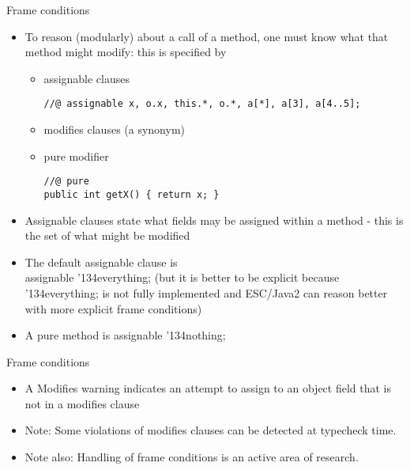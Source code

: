 \documentclass[
pdf,
nocolorBG,
slideColor,
cok,
]{prosper}
\newcommand{\bsl}{\char'134}
\begin{document}
\begin{slide}{Frame conditions}

\vspace*{-8ex}

\begin{itemize}
\item To reason (modularly) about a call of a method, one must know what that method might modify: this is specified by 
\begin{itemize}
\item {\knalblue assignable} clauses
{\tiny

\begin{verbatim}
//@ assignable x, o.x, this.*, o.*, a[*], a[3], a[4..5];
\end{verbatim}
}
\item {\knalblue modifies} clauses (a synonym)
\item {\knalblue pure} modifier
{\tiny

\begin{verbatim}
//@ pure
public int getX() { return x; }
\end{verbatim}
}

\end{itemize}
\item Assignable clauses state what fields may be assigned within a method
- this is the set of what might be modified
\item The default assignable clause is \\ {\knalblue assignable \bsl everything;} (but it is better to be explicit because {\knalblue \bsl everything;} is not fully implemented and ESC/Java2
can reason better with more explicit frame conditions)
\item A {\knalblue pure} method is  {\knalblue assignable \bsl nothing;}
\end{itemize}
\end{slide}

\begin{slide}{Frame conditions}

\vspace*{-6ex}

\begin{itemize}
\item A {\knalblue Modifies} warning indicates an attempt to assign to an object field that is not in a modifies clause
\item Note: Some violations of modifies clauses can be detected at typecheck time.
\item Note also:  Handling of frame conditions is an active area of research.
\end{itemize}
\end{slide}
\end{document}
